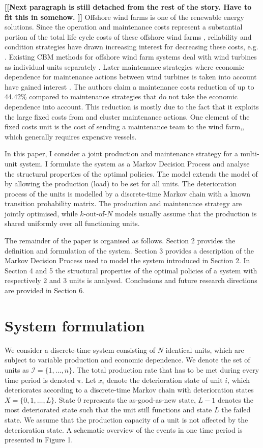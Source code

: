 \documentclass[a4paper,12pt]{article}
\begin{document}
\textbf{[[Next paragraph is still detached from the rest of the story. Have to fit this in somehow. ]]}
Offshore wind farms is one of the renewable energy solutions. Since the operation and maintenance costs represent a substantial portion of the total life cycle costs of these offshore wind farms \cite{hau2003wind}, reliability and condition strategies have drawn increasing interest for decreasing these costs, e.g. \cite{krokoszinski2003efficiency}. Existing CBM methods for offshore wind farm systems deal with wind turbines as individual units separately \citep{avner2007reliability}. Later maintenance strategies where economic dependence for maintenance actions between wind turbines is taken into account have gained interest \citep{tian2011condition}. The authors claim a maintenance costs reduction of up to 44.42\% compared to maintenance strategies that do not take the economic dependence into account. This reduction is mostly due to the fact that it exploits the large fixed costs from and cluster maintenance actions. One element of the fixed costs unit is the cost of sending a maintenance team to the wind farm,, which generally requires expensive vessels.

In this paper, I consider a joint production and maintenance strategy for a multi-unit system. I formulate the system as a Markov Decision Process and analyse the structural properties of the optimal policies. The model extends the model of \cite{OLDEKEIZER2018319} by allowing the production (load) to be set for all units. The deterioration process of the units is modelled by a discrete-time Markov chain with a known transition probability matrix. The production and maintenance strategy are jointly optimised, while $k$-out-of-$N$ models usually assume that the production is shared uniformly over all functioning units. 

The remainder of the paper is organised as follows. Section 2 provides the definition and formulation of the system. Section 3 provides a description of the Markov Decision Process used to model the system introduced in Section 2. In Section 4 and 5 the structural properties of the optimal policies of a system with respectively 2 and 3 units is analysed. Conclusions and future research directions are provided in Section 6.


\section{System formulation}
We consider a discrete-time system consisting of $N$ identical units, which are subject to variable production and economic dependence. We denote the set of units as $\mathcal{I} = \{1, \dots, n\}$. The total production rate that has to be met during every time period is denoted $\pi$.  Let $x_i$ denote the deterioration state of unit $i$, which deteriorates according to a discrete-time Markov chain with deterioration states $X = \{0, 1, \dots, L\}$. State $0$ represents the as-good-as-new state, $L-1$ denotes the most deteriorated state such that the unit still functions and state $L$ the failed state. We assume that the production capacity of a unit is not affected by the deterioration state. A schematic overview of the events in one time period is presented in Figure 1.
\end{document}
